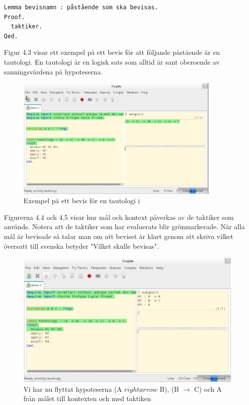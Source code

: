 \begin{lstlisting}
Lemma bevisnamn : påstående som ska bevisas.
Proof.
  taktiker.
Qed.
\end{lstlisting}

Figur 4.3 visar ett exempel på ett bevis för att följande påstående är en
tautologi. En tautologi är en logisk sats som alltid är sant oberoende av
sanningsvärdena på hypoteserna.


\begin{figure}[H]
  \centering
  \includegraphics[width=100mm]{images/Proof_part1}
  \caption[Exempel på bevis i \coq{}]
   {Exempel på ett bevis för en tautologi i \coq{}}
\end{figure}

Figurerna 4.4 och 4.5 visar hur mål och kontext påverkas av de taktiker som
används.
Notera att de taktiker som har evaluerats blir grönmarkerade.
När alla mål är bevisade så talar man om att beviset är klart genom att skriva
 vilket översatt till svenska betyder "Vilket skulle bevisas".


\begin{figure}[H]
  \centering
  \includegraphics[width=150mm]{images/Proof_part2}
  \caption[Bevis i \coq{} Ide]
   {Vi har nu flyttat hypoteserna (A $rightarrow$ B), (B $\rightarrow$ C) och A
    från målet till kontexten och med taktiken }
\end{figure}

